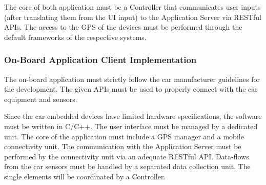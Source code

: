 The core of both application must be a Controller that communicates user inputs (after translating them from the UI input) to the Application Server via RESTful APIs. The access to the GPS of the devices must be performed through the default frameworks of the respective systems.


\subsubsection{On-Board Application Client Implementation}
The on-board application must strictly follow the car manufacturer guidelines for the development. The given APIs must be used to properly connect with the car equipment and sensors.

Since the car embedded devices have limited hardware specifications, the software must be written in C/C++. The user interface must be managed by a dedicated unit. The core of the application must include a GPS manager and a mobile connectivity unit. The communication with the Application Server must be performed by the connectivity unit via an adequate RESTful API. Data-flows from the car sensors must be handled by a separated data collection unit. The single elements will be coordinated by a Controller.


